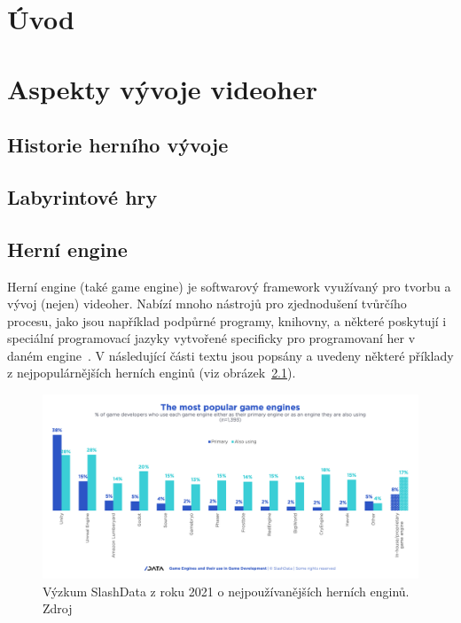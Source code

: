 
%
\chapter{Úvod}

\chapter{Aspekty vývoje  videoher}

\section{Historie herního vývoje}

\section{Labyrintové hry}

\section{Herní engine}
Herní engine (také game engine) je softwarový framework využívaný pro tvorbu a vývoj (nejen) videoher. Nabízí mnoho nástrojů pro zjednodušení tvůrčího procesu, jako jsou například podpůrné programy, knihovny, a některé poskytují i speciální programovací jazyky vytvořené specificky pro programovaní her v daném engine~\cite{Valencia-Garcia_2016}. V následující části textu jsou popsány a uvedeny některé příklady z nejpopulárnějších herních enginů (viz obrázek~\ref{most_popular_game_engines}).
\begin{figure}[H]
	\centering
	\includegraphics[width=\textwidth]{obrazky-figures/ch2/most_popular_game_engines.png}
	\caption{Výzkum SlashData z roku 2021 o nejpoužívanějších herních enginů. Zdroj~\cite{SlashData_game-engines}}
	\label{most_popular_game_engines}
\end{figure}

